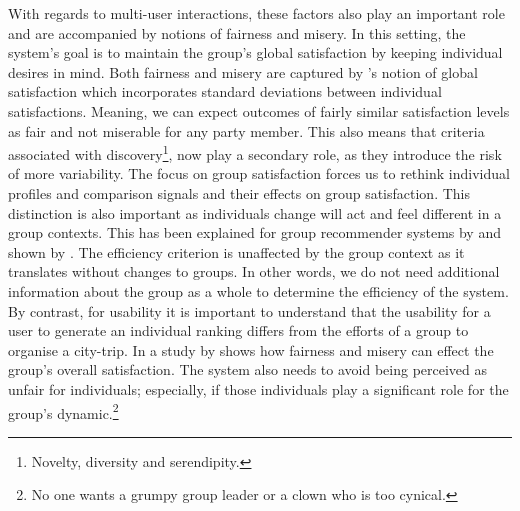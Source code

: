 \documentclass[11pt,a4paper,oneside]{article}
\begin{document}
With regards to multi-user interactions, these factors also play an important role and are accompanied by notions of fairness and misery.\cites{qi_RecommendingPackagesGroups_2016}{xiao_FairnessAwareGroupRecommendation_2017} In this setting, the system's goal is to maintain the group's global satisfaction by keeping individual desires in mind. Both fairness and misery are captured by \citeauthor{zhu_ContextAwareGroupRecommendation_2018}'s notion of global satisfaction which incorporates standard deviations between individual satisfactions.\cite{zhu_ContextAwareGroupRecommendation_2018} Meaning, we can expect outcomes of fairly similar satisfaction levels as fair and not miserable for any party member. This also means that criteria associated with discovery\footnote{Novelty, diversity and serendipity.}, now play a secondary role, as they introduce the risk of more variability. The focus on group satisfaction forces us to rethink individual profiles and comparison signals and their effects on group satisfaction. This distinction is also important as individuals change will act and feel different in a group contexts. This has been explained for group recommender systems by \citeauthor{masthoff_GroupRecommenderSystems_2015} and shown by \citeauthor{asch_OpinionsSocialPressure_1955}.\cites{masthoff_GroupRecommenderSystems_2015}{asch_OpinionsSocialPressure_1955} The efficiency criterion is unaffected by the group context as it translates without changes to groups. In other words, we do not need additional information about the group as a whole to determine the efficiency of the system. By contrast, for usability it is important to understand that the usability for a user to generate an individual ranking differs from the efforts of a group to organise a city-trip. In a study by \citeauthor{colquitt_JusticeTeamsReview_2005} shows how fairness and misery can effect the group's overall satisfaction.\cite{colquitt_JusticeTeamsReview_2005} The system also needs to avoid being perceived as unfair for individuals; especially, if those individuals play a significant role for the group's dynamic.\footnote{No one wants a grumpy group leader or a clown who is too cynical.\cites{wilkerson_TestCoworkersInfluence_2008}{glaso_ExperiencedAffectsLeader_2006}}       
\end{document}
